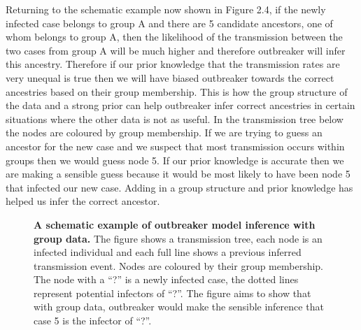 \documentclass[11pt,a4paper]{report}
\begin{document}
Returning to the schematic example now shown in Figure 2.4, if the newly infected case belongs to group A and there are 5 candidate ancestors, one of whom belongs to group A, then the likelihood of the transmission between the two cases from group A will be much higher and therefore outbreaker will infer this ancestry. Therefore if our prior knowledge that the transmission rates are very unequal is true then we will have biased outbreaker towards the correct ancestries based on their group membership. This is how the group structure of the data and a strong prior can help outbreaker infer correct ancestries in certain situations where the other data is not as useful. In the transmission tree below the nodes are coloured by group membership. If we are trying to guess an ancestor for the new case and we suspect that most transmission occurs within groups then we would guess node 5. If our prior knowledge is accurate then we are making a sensible guess because it would be most likely to have been node 5 that infected our new case. Adding in a group structure and prior knowledge has helped us infer the correct ancestor.
\begin{figure}[h!]
\centering
{}\newline

\caption{{\bf A schematic example of outbreaker model inference with group data.} The figure shows a transmission tree, each node is an infected individual and each full line shows a previous inferred transmission event. Nodes are coloured by their group membership. The node with a ``?'' is a newly infected case, the dotted lines represent potential infectors of ``?''. The figure aims to show that with group data, outbreaker would make the sensible inference that case 5 is the infector of ``?''.}
\end{figure}
\end{document}
